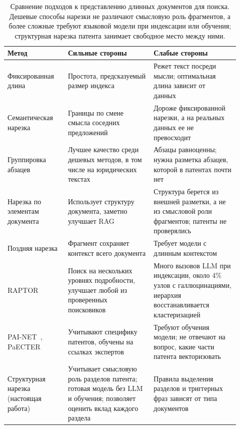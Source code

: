 \documentclass{article}
\begin{document}
\begin{table}[t]
    \centering
    \small
    \caption{Сравнение подходов к представлению длинных документов для поиска. Дешевые способы нарезки не различают смысловую роль фрагментов, а более сложные требуют языковой модели при индексации или обучения; структурная нарезка патента занимает свободное место между ними.}
    \label{tab:rw}
    \begin{tabular}{p{0.24\linewidth}p{0.34\linewidth}p{0.34\linewidth}}
        \toprule
        Метод & Сильные стороны & Слабые стороны \\
        \midrule
        Фиксированная длина~\citep{shaukat2026chunking} & Простота, предсказуемый размер индекса & Режет текст посреди мысли; оптимальная длина зависит от данных~\citep{bhat2025chunksize} \\
        Семантическая нарезка~\citep{qu2025semantic} & Границы по смене смысла соседних предложений & Дороже фиксированной нарезки, а на реальных данных ее не превосходит \\
        Группировка абзацев~\citep{shaukat2026chunking} & Лучшее качество среди дешевых методов, в том числе на юридических текстах & Абзацы равноценны; нужна разметка абзацев, которой в патентах почти нет \\
        Нарезка по элементам документа~\citep{jimenoyepes2024financial} & Использует структуру документа, заметно улучшает RAG & Структура берется из внешней разметки, а не из смысловой роли фрагментов; патенты не проверялись \\
        Поздняя нарезка~\citep{gunther2024late} & Фрагмент сохраняет контекст всего документа & Требует модели с длинным контекстом \\
        RAPTOR~\citep{sarthi2024raptor} & Поиск на нескольких уровнях подробности, улучшает любой из проверенных поисковиков & Много вызовов LLM при индексации, около 4\% узлов с галлюцинациями, иерархия восстанавливается кластеризацией \\
        PAI-NET~\citep{lee2025painet}, PaECTER~\citep{ghosh2024paecter} & Учитывают специфику патентов, обучены на ссылках экспертов & Требуют обучения модели; не отвечают на вопрос, какие части патента векторизовать \\
        \midrule
        Структурная нарезка (настоящая работа) & Учитывает смысловую роль разделов патента; готовая модель без LLM и обучения; позволяет оценить вклад каждого раздела & Правила выделения разделов и триггерных фраз зависят от типа документов \\
        \bottomrule
    \end{tabular}
\end{table}
\end{document}
